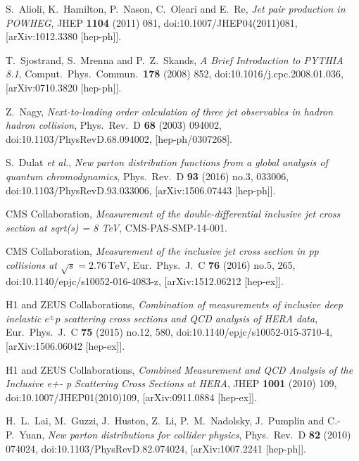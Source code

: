 \documentclass{PoS}
\begin{document}
\begin{thebibliography}{99}
  S.~Alioli, K.~Hamilton, P.~Nason, C.~Oleari and E.~Re,
  {\it Jet pair production in POWHEG},
  JHEP {\bf 1104} (2011) 081,
  doi:10.1007/JHEP04(2011)081,
  [arXiv:1012.3380 [hep-ph]].

  T.~Sjostrand, S.~Mrenna and P.~Z.~Skands,
  {\it A Brief Introduction to PYTHIA 8.1},
  Comput.\ Phys.\ Commun.\  {\bf 178} (2008) 852,
  doi:10.1016/j.cpc.2008.01.036,
  [arXiv:0710.3820 [hep-ph]].

  Z.~Nagy,
  {\it Next-to-leading order calculation of three jet observables in hadron hadron collision},
  Phys.\ Rev.\ D {\bf 68} (2003) 094002,
  doi:10.1103/PhysRevD.68.094002,
  [hep-ph/0307268].

  S.~Dulat {\it et al.},
  {\it New parton distribution functions from a global analysis of quantum chromodynamics},
  Phys.\ Rev.\ D {\bf 93} (2016) no.3,  033006,
  doi:10.1103/PhysRevD.93.033006,
  [arXiv:1506.07443 [hep-ph]].

  CMS Collaboration,
  {\it Measurement of the double-differential inclusive jet cross section at sqrt(s) = 8 TeV},
  CMS-PAS-SMP-14-001.

  CMS Collaboration,
  {\it Measurement of the inclusive jet cross section in pp collisions at $\sqrt{s} = 2.76\,\text {TeV}$},
  Eur.\ Phys.\ J.\ C {\bf 76} (2016) no.5,  265,
  doi:10.1140/epjc/s10052-016-4083-z,
  [arXiv:1512.06212 [hep-ex]].

  H1 and ZEUS Collaborations,
  {\it Combination of measurements of inclusive deep inelastic ${e^{\pm }p}$ scattering cross sections and QCD analysis of HERA data},
  Eur.\ Phys.\ J.\ C {\bf 75} (2015) no.12,  580,
  doi:10.1140/epjc/s10052-015-3710-4,
  [arXiv:1506.06042 [hep-ex]].

  H1 and ZEUS Collaborations,
  {\it Combined Measurement and QCD Analysis of the Inclusive e+- p Scattering Cross Sections at HERA},
  JHEP {\bf 1001} (2010) 109,
  doi:10.1007/JHEP01(2010)109,
  [arXiv:0911.0884 [hep-ex]].

  H.~L.~Lai, M.~Guzzi, J.~Huston, Z.~Li, P.~M.~Nadolsky, J.~Pumplin and C.-P.~Yuan,
  {\it New parton distributions for collider physics},
  Phys.\ Rev.\ D {\bf 82} (2010) 074024,
  doi:10.1103/PhysRevD.82.074024,
  [arXiv:1007.2241 [hep-ph]].


\end{thebibliography}
\end{document}
